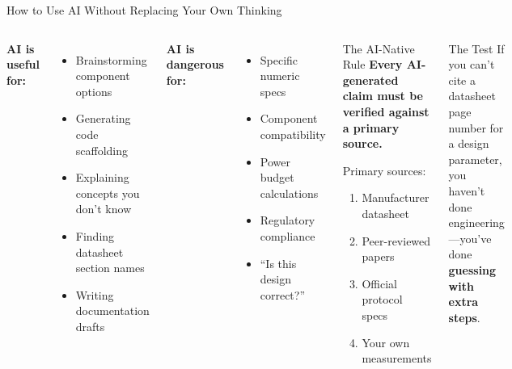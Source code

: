 \documentclass[aspectratio=169,11pt]{beamer}
\begin{document}
\begin{frame}{How to Use AI Without Replacing Your Own Thinking}
    \begin{columns}
        \textbf{AI is useful for:}
        \begin{itemize}
            \item Brainstorming component options
            \item Generating code scaffolding
            \item Explaining concepts you don't know
            \item Finding datasheet section names
            \item Writing documentation drafts
        \end{itemize}
        
        \vspace{0.3cm}
        \textbf{AI is dangerous for:}
        \begin{itemize}
            \item Specific numeric specs
            \item Component compatibility
            \item Power budget calculations
            \item Regulatory compliance
            \item ``Is this design correct?''
        \end{itemize}
        
        \begin{alertblock}{The AI-Native Rule}
            \textbf{Every AI-generated claim must be verified against a primary source.}
            
            \vspace{0.2cm}
            Primary sources:
            \begin{enumerate}
                \item Manufacturer datasheet
                \item Peer-reviewed papers
                \item Official protocol specs
                \item Your own measurements
            \end{enumerate}
        \end{alertblock}
        
        \vspace{0.2cm}
        \begin{exampleblock}{The Test}
            If you can't cite a datasheet page number for a design parameter, you haven't done engineering---you've done \textbf{guessing with extra steps}.
        \end{exampleblock}
    \end{columns}
\end{frame}
\end{document}
